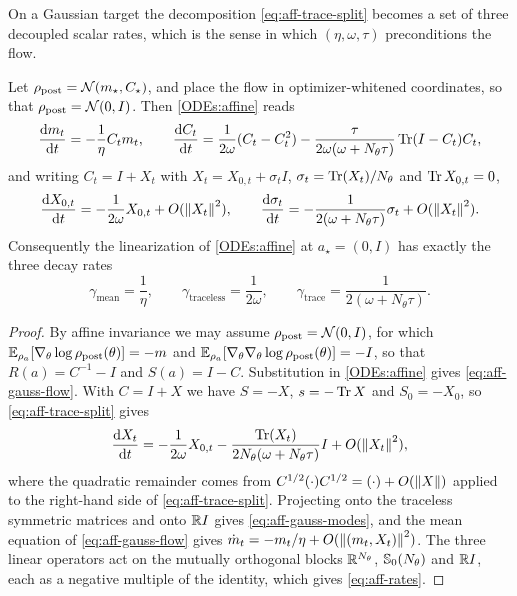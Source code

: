 On a Gaussian target the decomposition \eqref{eq:aff-trace-split} becomes a set of three decoupled scalar rates, which is the sense in which $(\eta, \omega, \tau)$ preconditions the flow.

\begin{theorem}\label{thm:aff-modes}
    Let $\rho_{\mathrm{post}} = \mathcal{N}(m_\star, C_\star)$, and place the flow in optimizer-whitened coordinates, so that $\rho_{\mathrm{post}} = \mathcal{N}(0, I)$. Then \eqref{ODEs:affine} reads
    \begin{equation}\label{eq:aff-gauss-flow}
        \frac{\mathrm{d} m_t}{\mathrm{d} t} = -\frac{1}{\eta} C_t m_t, \qquad \frac{\mathrm{d} C_t}{\mathrm{d} t} = \frac{1}{2\omega} (C_t - C_t^2) - \frac{\tau}{2\omega (\omega + N_\theta \tau)} \operatorname{Tr} (I - C_t) C_t,
    \end{equation}
    and writing $C_t = I + X_t$ with $X_t = X_{0,t} + \sigma_t I$, $\sigma_t = \operatorname{Tr}(X_t)/N_\theta$ and $\operatorname{Tr} X_{0,t} = 0$,
    \begin{equation}\label{eq:aff-gauss-modes}
        \frac{\mathrm{d} X_{0,t}}{\mathrm{d} t} = -\frac{1}{2\omega} X_{0,t} + O(\left\lVert X_t\right\rVert^2), \qquad \frac{\mathrm{d} \sigma_t}{\mathrm{d} t} = -\frac{1}{2(\omega + N_\theta \tau)} \sigma_t + O(\left\lVert X_t\right\rVert^2).
    \end{equation}
    Consequently the linearization of \eqref{ODEs:affine} at $a_\star = (0, I)$ has exactly the three decay rates
    \begin{equation}\label{eq:aff-rates}
        \gamma_{\mathrm{mean}} = \frac{1}{\eta}, \qquad \gamma_{\mathrm{traceless}} = \frac{1}{2\omega}, \qquad \gamma_{\mathrm{trace}} = \frac{1}{2(\omega + N_\theta \tau)}.
    \end{equation}
\end{theorem}

\begin{proof}
    By affine invariance we may assume $\rho_{\mathrm{post}} = \mathcal{N}(0, I)$, for which $\mathbb{E}_{\rho_a}[\nabla_\theta \log \rho_{\mathrm{post}}(\theta)] = -m$ and $\mathbb{E}_{\rho_a}[\nabla_\theta \nabla_\theta \log \rho_{\mathrm{post}}(\theta)] = -I$, so that $R(a) = C^{-1} - I$ and $S(a) = I - C$. Substitution in \eqref{ODEs:affine} gives \eqref{eq:aff-gauss-flow}. With $C = I + X$ we have $S = -X$, $s = -\operatorname{Tr} X$ and $S_0 = -X_0$, so \eqref{eq:aff-trace-split} gives
    \begin{equation*}
        \frac{\mathrm{d} X_t}{\mathrm{d} t} = -\frac{1}{2\omega} X_{0,t} - \frac{\operatorname{Tr}(X_t)}{2 N_\theta (\omega + N_\theta \tau)} I + O(\left\lVert X_t\right\rVert^2),
    \end{equation*}
    where the quadratic remainder comes from $C^{1/2} (\cdot) C^{1/2} = (\cdot) + O(\left\lVert X\right\rVert)$ applied to the right-hand side of \eqref{eq:aff-trace-split}. Projecting onto the traceless symmetric matrices and onto $\mathbb{R} I$ gives \eqref{eq:aff-gauss-modes}, and the mean equation of \eqref{eq:aff-gauss-flow} gives $\dot m_t = -m_t/\eta + O(\left\lVert (m_t, X_t)\right\rVert^2)$. The three linear operators act on the mutually orthogonal blocks $\mathbb{R}^{N_\theta}$, $\mathbb{S}_0(N_\theta)$ and $\mathbb{R} I$, each as a negative multiple of the identity, which gives \eqref{eq:aff-rates}.
\end{proof}

